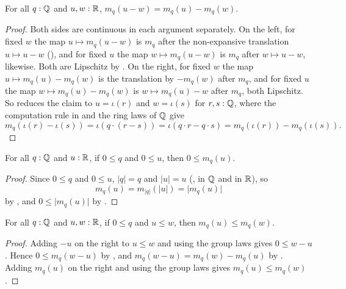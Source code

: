 \begin{lemma}
  \label{scaleDistRSub}
  For all $q : \mathbb{Q}$ and $u, w : \mathbb{R}$, $m_q(u - w) = m_q(u) - m_q(w)$.
\end{lemma}
\begin{proof}
  Both sides are continuous in each argument separately. On the left, for fixed $w$ the map $u \mapsto m_q(u - w)$ is $m_q$ after the non-expansive translation $u \mapsto u - w$ (), and for fixed $u$ the map $w \mapsto m_q(u - w)$ is $m_q$ after $w \mapsto u - w$, likewise. Both are Lipschitz by . On the right, for fixed $w$ the map $u \mapsto m_q(u) - m_q(w)$ is the translation by $-m_q(w)$ after $m_q$, and for fixed $u$ the map $w \mapsto m_q(u) - m_q(w)$ is $w \mapsto m_q(u) - w$ after $m_q$, both Lipschitz. So  reduces the claim to $u = \iota(r)$ and $w = \iota(s)$ for $r, s : \mathbb{Q}$, where the computation rule in  and the ring laws of $\mathbb{Q}$ give
  \[
    m_q(\iota(r) - \iota(s)) = \iota(q \cdot (r - s)) = \iota(q \cdot r - q \cdot s) = m_q(\iota(r)) - m_q(\iota(s)).
  \]
\end{proof}

\begin{lemma}
  \label{scaleNonNeg}
  For all $q : \mathbb{Q}$ and $u : \mathbb{R}$, if $0 \le q$ and $0 \le u$, then $0 \le m_q(u)$.
\end{lemma}
\begin{proof}
  Since $0 \le q$ and $0 \le u$, $\lvert q \rvert = q$ and $\lvert u \rvert = u$ (, in $\mathbb{Q}$ and in $\mathbb{R}$), so
  \[
    m_q(u) = m_{\lvert q \rvert}(\lvert u \rvert) = \lvert m_q(u) \rvert
  \]
  by , and $0 \le \lvert m_q(u) \rvert$ by .
\end{proof}

\begin{lemma}
  \label{scaleMonoLe}
  For all $q : \mathbb{Q}$ and $u, w : \mathbb{R}$, if $0 \le q$ and $u \le w$, then $m_q(u) \le m_q(w)$.
\end{lemma}
\begin{proof}
  Adding $-u$ on the right to $u \le w$ and using the group laws gives $0 \le w - u$. Hence $0 \le m_q(w - u)$ by , and $m_q(w - u) = m_q(w) - m_q(u)$ by . Adding $m_q(u)$ on the right and using the group laws gives $m_q(u) \le m_q(w)$.
\end{proof}

